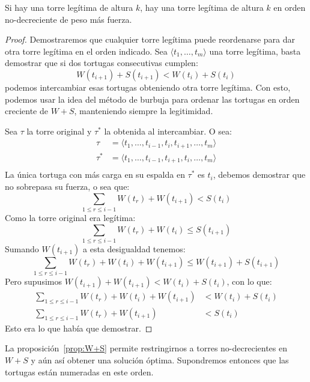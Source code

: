   \begin{proposition}
    \label{prop:W+S}
    Si hay una torre legítima de altura \(k\),
    hay una torre legítima de altura \(k\)
    en orden no-decreciente de peso más fuerza.
  \end{proposition}
  \begin{proof}
    Demostraremos que cualquier torre legítima
    puede reordenarse para dar otra torre legítima
    en el orden indicado.
    Sea \(\langle t_1, \dotsc, t_m \rangle\) una torre legítima,
    basta demostrar que si dos tortugas consecutivas cumplen:
    \begin{equation*}
      W(t_{i + 1}) + S(t_{i + 1})
        < W(t_i) + S(t_i)
    \end{equation*}
    podemos intercambiar esas tortugas obteniendo otra torre legítima.
    Con esto,
    podemos usar la idea del método de burbuja
    para ordenar las tortugas en orden creciente de \(W + S\),
    manteniendo siempre la legitimidad.

    Sea \(\tau\) la torre original y \(\tau^*\) la obtenida al intercambiar.
    O sea:
    \begin{align*}
      \tau
        &= \langle t_1, \dotsc, t_{i - 1},
                   t_i, t_{i + 1},
                   \dotsc, t_m \rangle \\
      \tau^*
        &= \langle t_1, \dotsc, t_{i - 1},
                   t_{i + 1}, t_i,
                   \dotsc, t_m \rangle \\
    \end{align*}
    La única tortuga con más carga en su espalda en \(\tau^*\) es \(t_i\),
    debemos demostrar que no sobrepasa su fuerza,
    o sea que:
    \begin{equation*}
      \sum_{1 \le r \le i - 1} W(t_r) + W(t_{i + 1})
        < S(t_i)
    \end{equation*}
    Como la torre original era legítima:
    \begin{equation*}
      \sum_{1 \le r \le i - 1} W(t_r) + W(t_i)
        \le S(t_{i + 1})
    \end{equation*}
    Sumando \(W(t_{i + 1})\) a esta desigualdad tenemos:
    \begin{equation*}
      \sum_{1 \le r \le i - 1} W(t_r) + W(t_i) + W(t_{i + 1})
        \le W(t_{i + 1}) + S(t_{i + 1})
    \end{equation*}
    Pero supusimos \(W(t_{i + 1}) + W(t_{i + 1}) < W(t_i) + S(t_i)\),
    con lo que:
    \begin{align*}
      \sum_{1 \le r \le i - 1} W(t_r) + W(t_i) + W(t_{i + 1})
        &< W(t_i) + S(t_i) \\
      \sum_{1 \le r \le i - 1} W(t_r) + W(t_{i + 1})
        &< S(t_i)
    \end{align*}
    Esto era lo que había que demostrar.
  \end{proof}
  La proposición~\ref{prop:W+S} permite restringirnos a torres
  no-decrecientes en \(W + S\) y aún así obtener una solución óptima.
  Supondremos entonces que las tortugas están numeradas en este orden.

